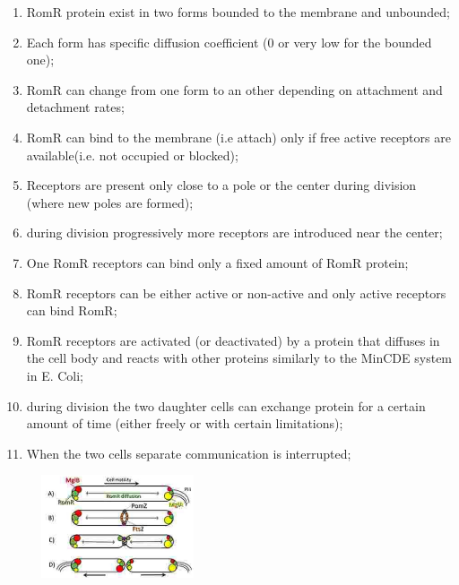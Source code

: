 \documentclass[12pt]{article}
\begin{document}
\begin{enumerate}
\item RomR protein exist in two forms bounded to the membrane and unbounded;
\item Each form has specific diffusion coefficient (0 or very low for the bounded one);
\item RomR can change from one form to an other depending on attachment and detachment rates;
\item RomR can bind to the membrane (i.e attach) only if free active receptors are available(i.e. not occupied or blocked);
\item Receptors are present only close to a pole or the center during division (where new poles are formed);
\item during division progressively more receptors are introduced near the center;
\item One RomR receptors can bind only a fixed amount of RomR protein;
\item RomR receptors can be either active or non-active and only active receptors can bind RomR;
\item RomR receptors are activated (or deactivated) by a protein that diffuses in the cell body and reacts with other proteins similarly to the MinCDE system in E. Coli;
\item during division the two daughter cells can exchange protein for a certain amount of time (either freely or with certain limitations);
\item When the two cells separate communication is interrupted; 
\end{enumerate}

\begin{figure}[H]
    \centering
    \includegraphics[width=0.4\textwidth]{division.jpeg}
    \caption{}
    \label{fig20}
\end{figure}
\end{document}
